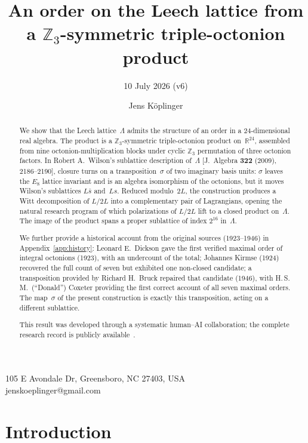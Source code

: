 \documentclass[twoside,english]{paper}
\numberwithin{equation}{section}
\numberwithin{figure}{section}
\newcommand{\lyxaddress}[1]{
	\par {\raggedright #1
	\vspace{1.4em}
	\noindent\par}
}
\theoremstyle{definition}
\theoremstyle{remark}
\newcommand{\RR}{\mathbb{R}}
\newcommand{\ZZ}{\mathbb{Z}}
\newcommand{\LL}{\Lambda}             %
\begin{document}
\title{An order on the Leech lattice from a $\ZZ_3$-symmetric
triple-octonion product}
\subtitle{10 July 2026 (v6)}
\author{Jens K\"oplinger}
\maketitle

\lyxaddress{105 E Avondale Dr, Greensboro, NC 27403, USA \\
jenskoeplinger@gmail.com}

\begin{abstract}
We show that the Leech lattice~$\LL$ admits the structure of an order
in a 24-dimensional real algebra.  The product is a
$\ZZ_3$-symmetric triple-octonion product on~$\RR^{24}$, assembled
from nine octonion-multiplication blocks under cyclic $\ZZ_3$
permutation of three octonion factors.  In Robert A.~Wilson's sublattice
description of~$\LL$ [J.~Algebra \textbf{322} (2009), 2186--2190],
closure turns on a transposition~$\sigma$ of
two imaginary basis units: $\sigma$ leaves the $E_8$ lattice
invariant and is an algebra isomorphism of the octonions, but it
moves Wilson's sublattices $L\bar s$ and~$Ls$.  Reduced modulo~$2L$,
the construction produces a Witt decomposition of $L/2L$ into a
complementary pair of Lagrangians, opening the natural research
program of which polarizations of $L/2L$ lift to a closed product
on~$\LL$.  The image of the product spans a proper sublattice of
index $2^{16}$ in~$\LL$.

We further provide a historical account from the original sources
(1923--1946) in Appendix~\ref{app:history}: Leonard E.~Dickson gave
the first verified maximal order of integral octonions (1923), with
an undercount of the total; Johannes Kirmse (1924) recovered the full
count of seven but exhibited one non-closed candidate; a
transposition provided by Richard H.~Bruck repaired that candidate
(1946), with H.\,S.\,M.~(``Donald'') Coxeter providing the first
correct account of all seven maximal orders.  The map~$\sigma$ of
the present construction is exactly this transposition, acting on a
different sublattice.

This result was developed through a systematic human--AI collaboration;
the complete research record is publicly available~\cite{repo}.
\end{abstract}

\section{Introduction}\label{sec:intro}
\end{document}
